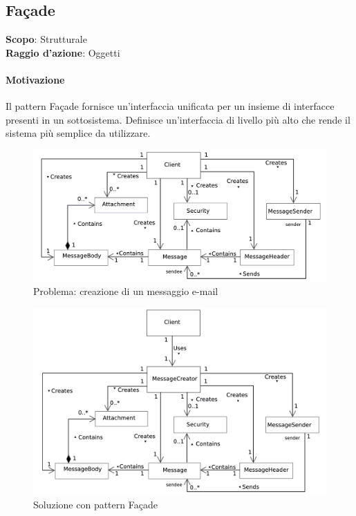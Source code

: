 \subsection{Façade}
\label{facade}

\textbf{Scopo}: Strutturale \\
\textbf{Raggio d'azione}: Oggetti

\paragraph{Motivazione} Il pattern Façade fornisce un'interfaccia unificata per un insieme di interfacce presenti in un sottosistema. Definisce un'interfaccia di livello più alto che rende il sistema più semplice da utilizzare.

\begin{figure}[H]
    \centering
    \includegraphics[width=1\linewidth]{assets/pattern/facade/facade-problema.png}
    \caption{Problema: creazione di un messaggio e-mail}
\end{figure}

\begin{figure}[H]
    \centering
    \includegraphics[width=1\linewidth]{assets/pattern/facade/facade-soluzione.png}
    \caption{Soluzione con pattern Façade}
\end{figure}

